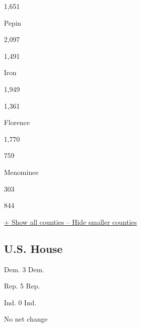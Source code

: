 1,651

Pepin

2,097

1,491

Iron

1,949

1,361

Florence

1,770

759

Menominee

303

844

\protect\hyperlink{}{+ Show all counties -- Hide smaller counties}

\hypertarget{us-house}{%
\subsection{U.S. House}\label{us-house}}

Dem. 3 Dem.

Rep. 5 Rep.

Ind. 0 Ind.

No net change

